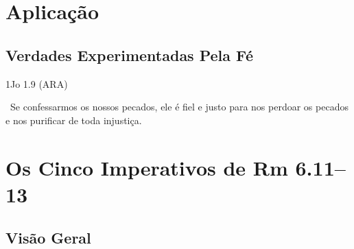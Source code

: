 \documentclass[12pt,aspectratio=169]{beamer}
\newcommand{\ver}[1]{%
    \raisebox{0.50ex}{%
        \scalebox{1.1}{%
            \pmb{\textbf{\textcolor{BSpbg}{#1}}}%
        }%
    }%
}
\newcommand{\QUOTE}[1]{%
    \par\noindent\hspace*{0.05\linewidth}%
    \begin{minipage}{0.9\linewidth}%
        \linespread{1.35}\large{#1}%
    \end{minipage}%
}
\newcommand{\YEL}[1]{{\textcolor{TXyel}{#1}}}
\begin{document}
\section{Aplicação}

    \subsection{Verdades Experimentadas Pela Fé}

    \begin{frame}{1Jo 1.9 (ARA)}
        \QUOTE{%
            \ver{9}~Se confessarmos os nossos pecados, \YEL{ele é fiel e justo para nos perdoar}
            os pecados e nos purificar de toda injustiça.
        }
    \end{frame}

\section{Os Cinco Imperativos de Rm 6.11--13}

    \subsection{Visão Geral}
\end{document}
